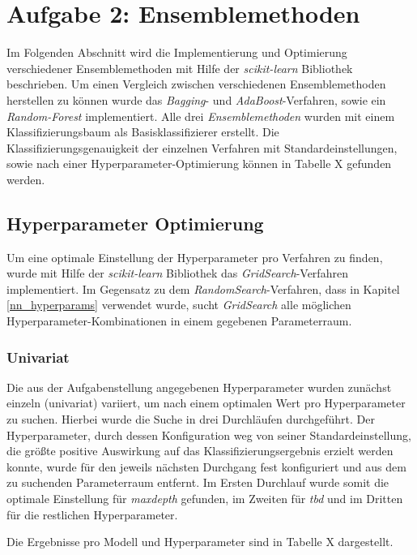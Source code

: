 \pagebreak
\section{Aufgabe 2: Ensemblemethoden}
Im Folgenden Abschnitt wird die Implementierung und Optimierung verschiedener Ensemblemethoden mit Hilfe der \emph{scikit-learn} Bibliothek beschrieben. Um einen Vergleich zwischen verschiedenen Ensemblemethoden herstellen zu können wurde das \emph{Bagging}- und \emph{AdaBoost}-Verfahren, sowie ein \emph{Random-Forest} implementiert. Alle drei \emph{Ensemblemethoden} wurden mit einem Klassifizierungsbaum als Basisklassifizierer erstellt. Die Klassifizierungsgenauigkeit der einzelnen Verfahren mit Standardeinstellungen, sowie nach einer Hyperparameter-Optimierung können in Tabelle X gefunden werden. 

\subsection{Hyperparameter Optimierung}
Um eine optimale Einstellung der Hyperparameter pro Verfahren zu finden, wurde mit Hilfe der \emph{scikit-learn} Bibliothek das \emph{GridSearch}-Verfahren implementiert. Im Gegensatz zu dem \emph{RandomSearch}-Verfahren, dass in Kapitel \ref{nn_hyperparams} verwendet wurde, sucht \emph{GridSearch} alle möglichen Hyperparameter-Kombinationen in einem gegebenen Parameterraum.

\subsubsection{Univariat}
Die aus der Aufgabenstellung angegebenen Hyperparameter wurden zunächst einzeln (univariat) variiert, um nach einem optimalen Wert pro Hyperparameter zu suchen. Hierbei wurde die Suche in drei Durchläufen durchgeführt. Der Hyperparameter, durch dessen Konfiguration weg von seiner Standardeinstellung, die größte positive Auswirkung auf das Klassifizierungsergebnis erzielt werden konnte, wurde für den jeweils nächsten Durchgang fest konfiguriert und aus dem zu suchenden Parameterraum entfernt. Im Ersten Durchlauf wurde somit die optimale Einstellung für \emph{maxdepth} gefunden, im Zweiten für \emph{tbd} und im Dritten für die restlichen Hyperparameter.

Die Ergebnisse pro Modell und Hyperparameter sind in Tabelle X dargestellt.

